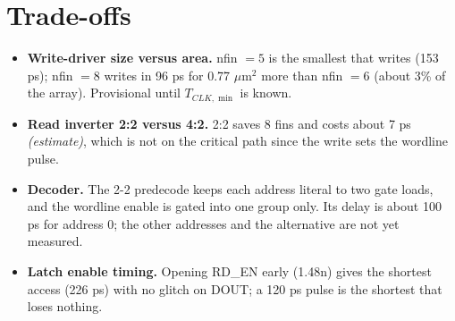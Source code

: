 \documentclass[10pt,letterpaper]{article}
\newcommand{\est}{\textit{(estimate)}}
\begin{document}
\section*{Trade-offs}
\begin{itemize}\setlength{\itemsep}{1pt}
\item \textbf{Write-driver size versus area.} nfin $=5$ is the smallest that writes (153 ps); nfin $=8$ writes in 96 ps for 0.77 $\mu$m$^2$ more than nfin $=6$ (about 3\% of the array). Provisional until $T_{CLK,\min}$ is known.
\item \textbf{Read inverter 2:2 versus 4:2.} 2:2 saves 8 fins and costs about 7 ps \est, which is not on the critical path since the write sets the wordline pulse.
\item \textbf{Decoder.} The 2-2 predecode keeps each address literal to two gate loads, and the wordline enable is gated into one group only. Its delay is about 100 ps for address 0; the other addresses and the alternative are not yet measured.
\item \textbf{Latch enable timing.} Opening RD\_EN early (1.48n) gives the shortest access (226 ps) with no glitch on DOUT; a 120 ps pulse is the shortest that loses nothing.
\end{itemize}
\end{document}
